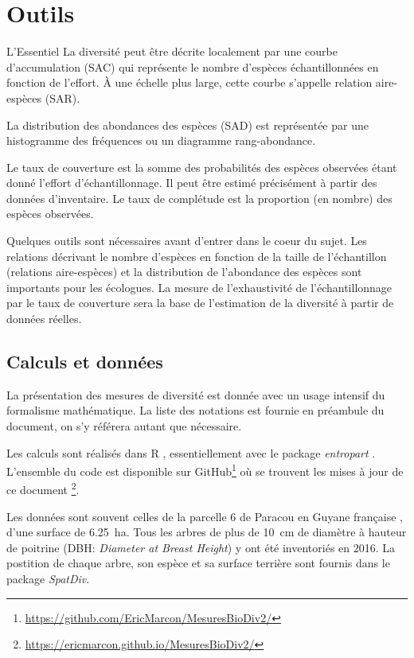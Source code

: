 \documentclass[
  11pt,
  french,
  a4paper,
  extrafontsizes,onecolumn,openright
  ]{memoir}
\newenvironment{Summary}
  {\begin{bclogo}[logo=\bctrombone, noborder=true, couleur=lightgray!50]{L'Essentiel}\parindent0pt}
  {\end{bclogo}}
\newlength{\rf}
\begin{document}
\hypertarget{outils}{%
\chapter{Outils}\label{outils}}

\scriptsize

\begin{Summary}
La diversité peut être décrite localement par une courbe d'accumulation
(SAC) qui représente le nombre d'espèces échantillonnées en fonction de
l'effort. À une échelle plus large, cette courbe s'appelle relation
aire-espèces (SAR).

La distribution des abondances des espèces (SAD) est représentée par une
histogramme des fréquences ou un diagramme rang-abondance.

Le taux de couverture est la somme des probabilités des espèces
observées étant donné l'effort d'échantillonnage. Il peut être estimé
précisément à partir des données d'inventaire. Le taux de complétude est
la proportion (en nombre) des espèces observées.
\end{Summary}

\normalsize

Quelques outils sont nécessaires avant d'entrer dans le coeur du sujet.
Les relations décrivant le nombre d'espèces en fonction de la taille de l'échantillon (relations aire-espèces) et la distribution de l'abondance des espèces sont importants pour les écologues.
La mesure de l'exhaustivité de l'échantillonnage par le taux de couverture sera la base de l'estimation de la diversité à partir de données réelles.

\hypertarget{calculs-et-donnuxe9es}{%
\section{Calculs et données}\label{calculs-et-donnuxe9es}}

La présentation des mesures de diversité est donnée avec un usage intensif du formalisme mathématique.
La liste des notations est fournie en préambule du document, on s'y référera autant que nécessaire.

Les calculs sont réalisés dans R \autocite{R}, essentiellement avec le package \emph{entropart} \autocite{Marcon2014c}.
L'ensemble du code est disponible sur GitHub\footnote{\url{https://github.com/EricMarcon/MesuresBioDiv2/}} où se trouvent les mises à jour de ce document \footnote{\url{https://ericmarcon.github.io/MesuresBioDiv2/}}.

Les données sont souvent celles de la parcelle 6 de Paracou en Guyane française \autocite{Gourlet-Fleury2004}, d'une surface de 6.25~ha.
Tous les arbres de plus de 10~cm de diamètre à hauteur de poitrine (DBH: \emph{Diameter at Breast Height}) y ont été inventoriés en 2016.
La postition de chaque arbre, son espèce et sa surface terrière sont fournis dans le package \emph{SpatDiv}.
\end{document}
